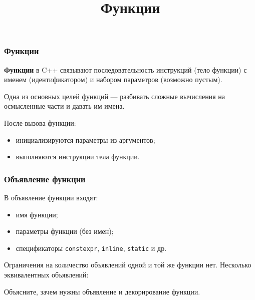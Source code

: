 \documentclass[compress, 8pt]{beamer}
\title{Функции}
\begin{document}
\frame[plain]{\titlepage}

\begin{frame}[fragile]

    \frametitle{Функции}

    \textbf{Функции} в C++ связывают последовательность инструкций (тело функции)
    с именем (идентификатором) и набором параметров (возможно пустым).

    \hfill\break
    Одна из основных целей функций --- разбивать сложные вычисления на осмысленные
    части и давать им имена.

    \hfill\break
    После вызова функции:

    \begin{itemize}
        \item инициализируются параметры из аргументов;
        \item выполняются инструкции тела функции.
    \end{itemize}

\end{frame}

\begin{frame}[fragile]

    \frametitle{Объявление функции}

    В объявление функции входят:

    \begin{itemize}
        \item имя функции;
        \item параметры функции (без имен);
        \item спецификаторы \verb|constexpr|, \verb|inline|, \verb|static| и др.
    \end{itemize}

    \hfill\break
    Ограничения на количество объявлений одной и той же функции нет.
    Несколько эквивалентных объявлений:

    \centering
    \hfill\break

    \begin{task}
        Объясните, зачем нужны объявление и декорирование функции.
    \end{task}

\end{frame}
\end{document}
